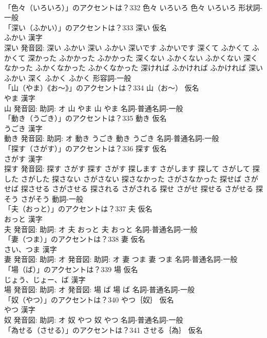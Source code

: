\documentclass[8pt]{extreport}
\begin{document}
\begin{CJK}{UTF8}{min}
\\	「色々（いろいろ）」のアクセントは？332		色々 いろいろ		色々 いろいろ				形状詞-一般 
\\	「深い（ふかい）」のアクセントは？333	深い 仮名　
\\	ふかい 漢字　
\\	深い 発音図:	深い ふかい		深い ふかい 深いです ふかいです 深くて ふかくて ふかくて 深かった ふかかった ふかかった 深くない ふかくない ふかくない 深くなかった ふかくなかった ふかくなかった 深ければ ふかければ ふかければ 深い ふかい 深く ふかく ふかく				形容詞-一般 
\\	「山（やま）《お〜》」のアクセントは？334	山（お〜） 仮名　
\\	やま 漢字　
\\	山 発音図: 助詞: オ	山 やま		山 やま				名詞-普通名詞-一般 
\\	「動き（うごき）」のアクセントは？335	動き 仮名　
\\	うごき 漢字　
\\	動き 発音図: 助詞: オ	動き うごき		動き うごき				名詞-普通名詞-一般 
\\	「探す（さがす）」のアクセントは？336	探す 仮名　
\\	さがす 漢字　
\\	探す 発音図:	探す さがす		探す さがす 探します さがします 探して さがして 探した さがした 探さない さがさない 探さなかった さがさなかった 探せば さがせば 探させる さがさせる 探される さがされる 探せ さがせ 探せる さがせる 探そう さがそう				動詞-一般 
\\	「夫（おっと）」のアクセントは？337	夫 仮名　
\\	おっと 漢字　
\\	夫 発音図: 助詞: オ	夫 おっと		夫 おっと				名詞-普通名詞-一般 
\\	「妻（つま）」のアクセントは？338	妻 仮名　
\\	さい、つま 漢字　
\\	妻 発音図: 助詞: オ 発音図: 助詞: オ	妻 つま		妻 つま				名詞-普通名詞-一般 
\\	「場（ば）」のアクセントは？339	場 仮名　
\\	じょう、じょー、ば 漢字　
\\	場 発音図: 助詞: オ 発音図:	場 ば		場 ば				名詞-普通名詞-一般 
\\	「奴（やつ）」のアクセントは？340	やつ｛奴｝ 仮名　
\\	やつ 漢字　
\\	奴 発音図: 助詞: オ	奴 やつ		奴 やつ				名詞-普通名詞-一般 
\\	「為せる（させる）」のアクセントは？341	させる｛為｝ 仮名　

\end{CJK}
\end{document}
